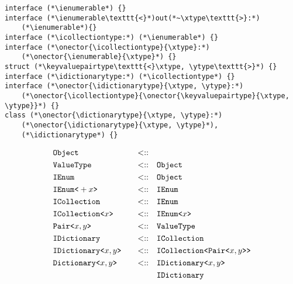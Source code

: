    \begin{lstlisting}
interface (*\ienumerable*) {}
interface (*\ienumerable\texttt{<}*)out(*~\xtype\texttt{>}:*)
    (*\ienumerable*){}
interface (*\icollectiontype:*) (*\ienumerable*) {}
interface (*\onector{\icollectiontype}{\xtype}:*)
    (*\onector{\ienumerable}{\xtype}*) {}
struct (*\keyvaluepairtype\texttt{<}\xtype, \ytype\texttt{>}*) {}
interface (*\idictionarytype:*) (*\icollectiontype*) {}
interface (*\onector{\idictionarytype}{\xtype, \ytype}:*)
    (*\onector{\icollectiontype}{\onector{\keyvaluepairtype}{\xtype, \ytype}}*) {}
class (*\onector{\dictionarytype}{\xtype, \ytype}:*)
    (*\onector{\idictionarytype}{\xtype, \ytype}*),
    (*\idictionarytype*) {}
    \end{lstlisting}
\begin{alignat*}{3}
    &\texttt{Object} \quad &<::& \quad  \\
    &\texttt{ValueType} \quad &<::& \quad \texttt{Object} \\
    &\texttt{IEnum} \quad &<::& \quad \texttt{Object} \\
    &\texttt{IEnum}\texttt{<}+{x}\texttt{>} \quad &<::& \quad \texttt{IEnum} \\
    &\texttt{ICollection} \quad &<::& \quad \texttt{IEnum} \\
    &\texttt{ICollection}\texttt{<}{x}\texttt{>} \quad &<::& \quad \texttt{IEnum}\texttt{<}{x}\texttt{>} \\
    &\texttt{Pair}\texttt{<}{x}, {y}\texttt{>} \quad &<::& \quad \texttt{ValueType} \\
    &\texttt{IDictionary} \quad &<::& \quad \texttt{ICollection} \\
    &\texttt{IDictionary}\texttt{<}{x}, {y}\texttt{>} \quad &<::& \quad \texttt{ICollection}\texttt{<}\texttt{Pair}\texttt{<}{x}, {y}\texttt{>}\texttt{>} \\
    &\texttt{Dictionary}\texttt{<}{x}, {y}\texttt{>} \quad &<::& \quad \texttt{IDictionary}\texttt{<}{x}, {y}\texttt{>} \\
    & \quad && \quad \texttt{IDictionary}
\end{alignat*}
